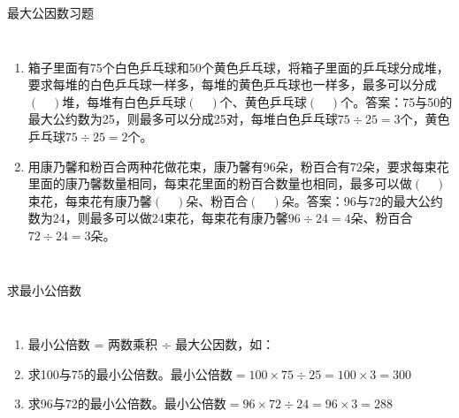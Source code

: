 \documentclass[aspectratio=169]{ctexbeamer} %
\begin{document}
\begin{frame}[t]{最大公因数习题}
\begin{columns}
\begin{enumerate}[label={\arabic*.}]
\item 箱子里面有75个白色乒乓球和50个黄色乒乓球，将箱子里面的乒乓球分成堆，要求每堆的白色乒乓球一样多，每堆的黄色乒乓球也一样多，最多可以分成$(\quad)$堆，每堆有白色乒乓球$(\quad)$个、黄色乒乓球$(\quad)$个。\pause \alert{答案：75与50的最大公约数为25，则最多可以分成25对，每堆白色乒乓球$75 \div 25 = 3$个，黄色乒乓球$75 \div 25 = 2$个。}
\item 用康乃馨和粉百合两种花做花束，康乃馨有96朵，粉百合有72朵，要求每束花里面的康乃馨数量相同，每束花里面的粉百合数量也相同，最多可以做$(\quad)$束花，每束花有康乃馨$(\quad)$朵、粉百合$(\quad)$朵。\pause \alert{答案：96与72的最大公约数为24，则最多可以做24束花，每束花有康乃馨$96 \div 24 = 4$朵、粉百合$72 \div 24 = 3$朵。}
\end{enumerate}
\end{columns}
\end{frame}

\begin{frame}[t]{求最小公倍数}
\begin{columns}
\begin{enumerate}[label={\arabic*.}]
\item 最小公倍数 = 两数乘积 ÷ 最大公因数，如：
\item 求100与75的最小公倍数。\pause 最小公倍数$ = 100 \times 75 \div 25 = 100 \times 3 = 300$
\item 求96与72的最小公倍数。\pause 最小公倍数$ = 96 \times 72 \div 24 = 96 \times 3 = 288$
\end{enumerate}
\end{columns}
\end{frame}
\end{document}
